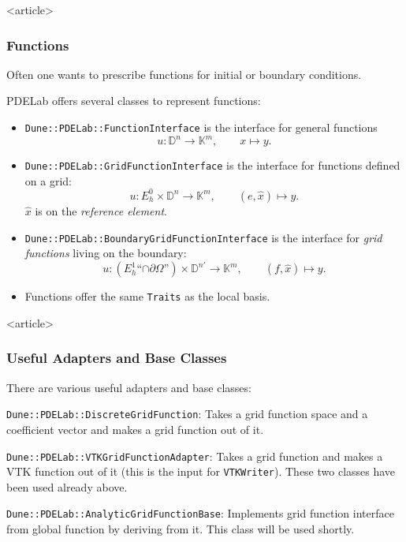 \begin{frame}<article>
\frametitle{Functions}
Often one wants to prescribe functions for initial or boundary
conditions.

PDELab offers several classes to represent functions:
\begin{itemize}
\item \lstinline{Dune::PDELab::FunctionInterface} is the interface for general
functions $$u : \mathbb{D}^n \to \mathbb{K}^m, \qquad x \mapsto y.$$ 
\item \lstinline{Dune::PDELab::GridFunctionInterface} is the interface
for functions defined on a grid:
$$u : E_h^0 \times \mathbb{D}^n \to \mathbb{K}^m, \qquad
(e,\hat{x}) \mapsto y.$$
$\hat{x}$ is on the \textit{reference element}.
\item \lstinline{Dune::PDELab::BoundaryGridFunctionInterface} is the
interface for \textit{grid functions} living on the boundary:
$$u : (E_h^1\text{``$\cap\partial\Omega$''}) \times \mathbb{D}^{n'} \to \mathbb{K}^m, \qquad
(f,\hat{x}) \mapsto y.$$
\item Functions offer the same \lstinline{Traits} as the local basis.
\end{itemize}
\end{frame}


\begin{frame}<article>
\frametitle{Useful Adapters and Base Classes}
There are various useful adapters and base classes:

\lstinline{Dune::PDELab::DiscreteGridFunction}: Takes a grid
function space and a coefficient vector and makes a grid function out
of it.

\lstinline{Dune::PDELab::VTKGridFunctionAdapter}: Takes a grid
function and makes a VTK function out of it (this is the input
for \lstinline{VTKWriter}). These two classes have been used already above.

\lstinline{Dune::PDELab::AnalyticGridFunctionBase}: Implements
grid function interface from global function by deriving from it.
This class will be used shortly.

\end{frame}

